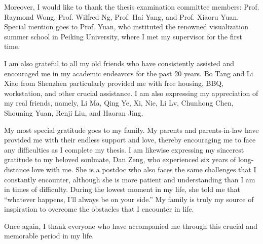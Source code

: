 Moreover, I would like to thank the thesis examination committee members: Prof. Raymond Wong, Prof. Wilfred Ng, Prof. Hai Yang, and Prof. Xiaoru Yuan. Special mention goes to Prof. Yuan, who instituted the renowned visualization summer school in Peiking University, where I met my supervisor for the first time.  

I am also grateful to all my old friends who have consistently assisted and encouraged me in my academic endeavors for the past 20 years. Bo Tang and Li Xiao from Shenzhen particularly provided me with free housing, BBQ, workstation, and other crucial assistance. I am also expressing my appreciation of my real friends, namely, Li Ma, Qing Ye, Xi, Nie, Li Lv, Chunhong Chen, Shouning Yuan, Renji Liu, and Haoran Jing.

My most special gratitude goes to my family. My parents and parents-in-law have provided me with their endless support and love, thereby encouraging me to face any difficulties as I complete my thesis. I am likewise expressing my sincerest gratitude to my beloved soulmate, Dan Zeng, who experienced six years of long-distance love with me. She is a postdoc who also faces the same challenges that I constantly encounter, although she is more patient and understanding than I am in times of difficulty. During the lowest moment in my life, she told me that “whatever happens, I’ll always be on your side.” My family is truly my source of inspiration to overcome the obstacles that I encounter in life.

Once again, I thank everyone who have accompanied me through this crucial and memorable period in my life.


\endacknowledgments
